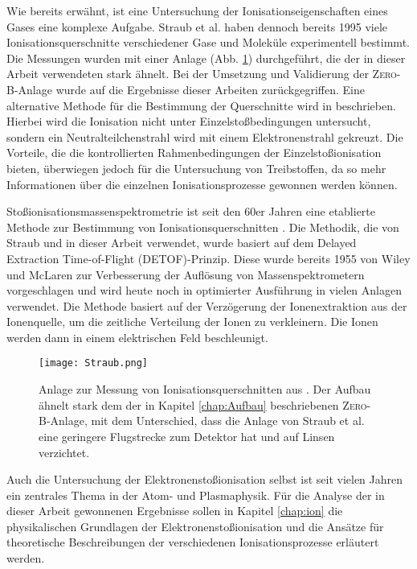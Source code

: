 Wie bereits erwähnt, ist eine Untersuchung der Ionisationseigenschaften eines Gases eine komplexe Aufgabe. Straub et al. \cite{Straub}\cite{Straub2} haben dennoch bereits 1995 viele Ionisationsquerschnitte verschiedener Gase und Moleküle experimentell bestimmt. Die Messungen wurden mit einer Anlage (Abb. \ref{fig:Straub}) durchgeführt, die der in dieser Arbeit verwendeten stark ähnelt. Bei der Umsetzung und Validierung der \textsc{Zero-B}-Anlage wurde auf die Ergebnisse dieser Arbeiten zurückgegriffen. Eine alternative Methode für die Bestimmung der Querschnitte wird in \cite{other_method} beschrieben. Hierbei wird die Ionisation nicht unter Einzelstoßbedingungen untersucht, sondern ein Neutralteilchenstrahl wird mit einem Elektronenstrahl gekreuzt. Die Vorteile, die die kontrollierten Rahmenbedingungen der Einzelstoßionisation bieten, überwiegen jedoch für die Untersuchung von Treibstoffen, da so mehr Informationen über die einzelnen Ionisationsprozesse gewonnen werden können.

Stoßionisationsmassenspektrometrie ist seit den 60er Jahren eine etablierte Methode zur Bestimmung von Ionisationsquerschnitten \cite{EITOFMS}. Die Methodik, die von Straub  und in dieser Arbeit verwendet, wurde basiert auf dem Delayed Extraction Time-of-Flight (DETOF)-Prinzip. Diese wurde bereits 1955 von Wiley und McLaren zur Verbesserung der Auflösung von Massenspektrometern vorgeschlagen \cite{DETOF} und wird heute noch in optimierter Ausführung in vielen Anlagen verwendet. Die Methode basiert auf der Verzögerung der Ionenextraktion aus der Ionenquelle, um die zeitliche Verteilung der Ionen zu verkleinern. Die Ionen werden dann in einem elektrischen Feld beschleunigt.
\begin{figure}
    \centering
    \texttt{[image: Straub.png]}
    \caption[Anlage zur Messung von Ionisationsquerschnitten von Straub et al.]{Anlage zur Messung von Ionisationsquerschnitten aus \cite{Straub2}. Der Aufbau ähnelt stark dem der in Kapitel \ref{chap:Aufbau} beschriebenen \textsc{Zero-B}-Anlage, mit dem Unterschied, dass die Anlage von Straub et al. eine geringere Flugstrecke zum Detektor hat und auf Linsen verzichtet.}
    \label{fig:Straub}
\end{figure}
Auch die Untersuchung der Elektronenstoßionisation selbst ist seit vielen Jahren ein zentrales Thema in der Atom- und Plasmaphysik. Für die Analyse der in dieser Arbeit gewonnenen Ergebnisse sollen in Kapitel \ref{chap:ion} die physikalischen Grundlagen der Elektronenstoßionisation und die Ansätze für theoretische Beschreibungen der verschiedenen Ionisationsprozesse erläutert werden.
